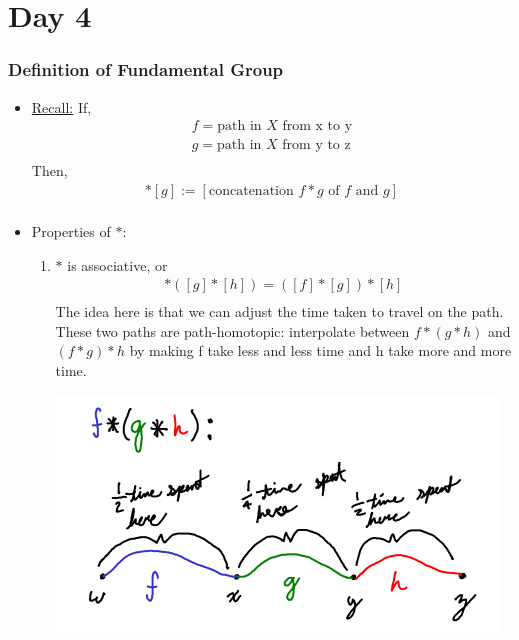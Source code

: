 \section{Day 4}
    \subsubsection{Definition of Fundamental Group}
    \begin{itemize}
        \item \underline{Recall:} If,
            \begin{align*}
                f=\text{path in $X$ from x to y}\\
                g=\text{path in $X$ from y to z}\\
            \end{align*}
            Then,
            \begin{align*}
                [f]*[g]:=[\text{concatenation $f*g$ of $f$ and $g$}]\\
            \end{align*}
        \item{Properties of $*$:}
            \begin{enumerate}
                \item $*$ is associative, or
                    \begin{align*}
                        [f]*([g]*[h])=([f]*[g])*[h]\\
                    \end{align*}
                    The idea here is that we can adjust the time taken to travel on the path.
                    These two paths are path-homotopic: interpolate between $f*(g*h)$ and
                    $(f*g)*h$ by making f take less and less time and h take more and more time.\\
            \begin{minipage}[c]{\linewidth}
                \begin{center}
                \includegraphics[]{images/association.png}

\end{center}
\end{minipage}
\end{enumerate}
\end{itemize}

